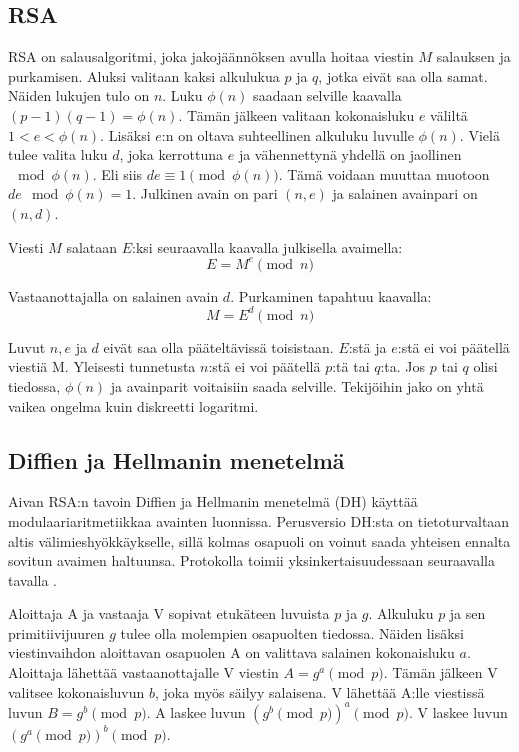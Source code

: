 \documentclass[finnish]{tktltiki2}
\theoremstyle{definition}
\theoremstyle{remark}
\begin{document}
\subsection{RSA}

RSA on salausalgoritmi, joka jakojäännöksen avulla hoitaa viestin $M$ salauksen ja purkamisen. Aluksi valitaan kaksi alkulukua $p$ ja $q$, jotka eivät saa olla samat. Näiden lukujen tulo on $n$. Luku $\phi(n)$ saadaan selville kaavalla $(p-1)(q-1) = \phi(n)$. Tämän jälkeen valitaan kokonaisluku $e$ väliltä $1 < e < \phi(n)$. Lisäksi $e$:n on oltava suhteellinen alkuluku luvulle $\phi(n)$. Vielä tulee valita luku $d$, joka kerrottuna $e$ ja vähennettynä yhdellä on jaollinen$\mod{\phi(n)}$. Eli siis $d e \equiv 1\pmod{\phi(n)}$. Tämä voidaan muuttaa muotoon $de \mod{\phi(n)} = 1$. Julkinen avain on pari $(n, e)$ ja salainen avainpari on $(n, d)$.   

Viesti $M$ salataan $E$:ksi seuraavalla kaavalla julkisella avaimella: $$E = M^e \pmod{n}$$

Vastaanottajalla on salainen avain $d$. Purkaminen tapahtuu kaavalla: 
$$ M = E^d \pmod{n} $$

Luvut $n, e$ ja $d$ eivät saa olla pääteltävissä toisistaan. $E$:stä ja $e$:stä ei voi päätellä viestiä M. Yleisesti tunnetusta $n$:stä ei voi päätellä $p$:tä tai $q$:ta. Jos $p$ tai $q$ olisi tiedossa, $\phi(n)$ ja avainparit voitaisiin saada selville. Tekijöihin jako on yhtä vaikea ongelma kuin diskreetti logaritmi. \cite{math1}


\subsection{Diffien ja Hellmanin menetelmä}

Aivan RSA:n tavoin Diffien ja Hellmanin menetelmä (DH) käyttää modulaariaritmetiikkaa avainten luonnissa. Perusversio DH:sta on tietoturvaltaan altis välimieshyökkäykselle, sillä kolmas osapuoli on voinut saada yhteisen ennalta sovitun avaimen haltuunsa. Protokolla toimii yksinkertaisuudessaan seuraavalla tavalla \cite{math2}.

Aloittaja A ja vastaaja V sopivat etukäteen luvuista $p$ ja $g$. Alkuluku  $p$ ja sen primitiivijuuren $g$ tulee olla molempien osapuolten tiedossa. Näiden lisäksi viestinvaihdon aloittavan osapuolen A on valittava salainen kokonaisluku $a$. Aloittaja lähettää vastaanottajalle V viestin $A = g^a \pmod{p}$. Tämän jälkeen V valitsee kokonaisluvun $b$, joka myös säilyy salaisena. V lähettää A:lle viestissä luvun $B = g^b \pmod{p}$. A laskee luvun $(g^b \pmod{p})^a \pmod{p}$. V laskee luvun $(g^a \pmod{p})^b \pmod{p}$.
\end{document}
